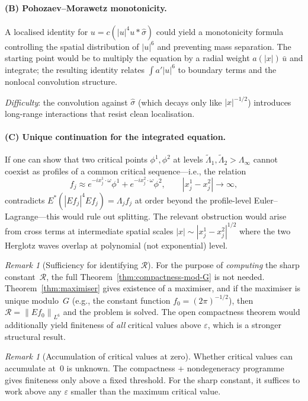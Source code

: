 \documentclass[12pt]{article}
\theoremstyle{definition}
\theoremstyle{remark}
\newtheorem{remark}[theorem]{Remark}
\newcommand{\wh}{\widehat}
\newcommand{\norm}[1]{\left\|#1\right\|}
\begin{document}
\paragraph{(B) Pohozaev--Morawetz monotonicity.}
A localised identity for $u=c(|u|^4u\ast\wh\sigma)$ could yield
a monotonicity formula controlling the spatial distribution of
$|u|^6$ and preventing mass separation.  The starting point would be
to multiply the equation by a radial weight $a(|x|)\,\bar u$ and
integrate; the resulting identity relates $\int a'|u|^6$ to boundary
terms and the nonlocal convolution structure.

\emph{Difficulty}: the convolution against $\wh\sigma$ (which decays
only like $|x|^{-1/2}$) introduces long-range interactions that
resist clean localisation.

\paragraph{(C) Unique continuation for the integrated equation.}
If one can show that two critical points $\phi^1,\phi^2$ at levels
$\widetilde\Lambda_1,\widetilde\Lambda_2>\Lambda_\infty$ cannot
coexist as profiles of a common critical sequence---i.e., the
relation
\[
  f_j\approx e^{-ix_j^1\cdot\omega}\phi^1+e^{-ix_j^2\cdot\omega}\phi^2,
  \qquad |x_j^1-x_j^2|\to\infty,
\]
contradicts $E^*(|Ef_j|^4Ef_j)=\Lambda_jf_j$ at order beyond the
profile-level Euler--Lagrange---this would rule out splitting.  The
relevant obstruction would arise from cross terms at intermediate
spatial scales $|x|\sim|x_j^1-x_j^2|^{1/2}$ where the two Herglotz
waves overlap at polynomial (not exponential) level.

\begin{remark}[Sufficiency for identifying $\mathcal R$]
  \label{rem:sufficiency-max}
  For the purpose of \emph{computing} the sharp constant~$\mathcal R$,
  the full Theorem~\ref{thm:compactness-mod-G} is not needed.
  Theorem~\ref{thm:maximiser} gives existence of a maximiser, and if
  the maximiser is unique modulo~$G$ (e.g., the constant function
  $f_0=(2\pi)^{-1/2}$), then $\mathcal R=\norm{Ef_0}_{L^6}$ and
  the problem is solved.  The open compactness theorem would
  additionally yield finiteness of \emph{all} critical values above
  $\varepsilon$, which is a stronger structural result.
\end{remark}

\begin{remark}[Accumulation of critical values at zero]
  \label{rem:accumulation}
  Whether critical values can accumulate at~$0$ is unknown.  The
  compactness + nondegeneracy programme gives finiteness only
  above a fixed threshold.  For the sharp constant, it suffices to
  work above any $\varepsilon$ smaller than the maximum critical
  value.
\end{remark}
\end{document}
